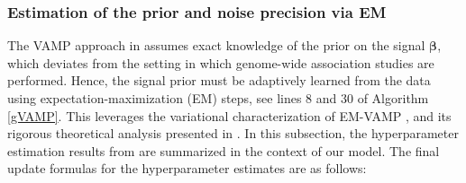 \subsubsection{Estimation of the prior and noise precision via EM}
The VAMP approach in \cite{rangan_vector_2019} assumes exact knowledge of the prior on the signal $\bm\beta$, which deviates from the setting in which genome-wide association studies are performed. Hence, the signal prior must be adaptively learned from the data using expectation-maximization (EM) steps, see lines 8 and 30 of Algorithm \ref{gVAMP}. This leverages the variational characterization of EM-VAMP \cite{LearningFreeEnergies2018}, and its rigorous theoretical analysis presented in \cite{RigorousDynamics2017}. In this subsection, the hyperparameter estimation results from \cite{EMGAMP2012} are summarized in the context of our model. The final update formulas for the hyperparameter estimates are as follows:
